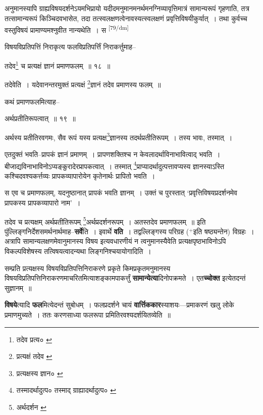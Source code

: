 \documentclass[article,12pt,a4paper]{memoir}
\newcommand{\add}[1]{($^{+}$#1)}
\begin{document}
	  \pstart अनुमानस्यापि ग्राह्यविषयदर्शनेऽयमभिप्रायो यदीदमनुमानमनर्थमनग्निव्यावृत्तिमात्रं सामान्यरूपं गृहणाति, तत्र तत्सामान्यरूपं किञ्चिदवभासेत, तदा तत्स्वलक्षणत्वेनावस्यत्स्वलक्षणं प्रवृत्तिविषयीकुर्यात् । तथा कुर्वच्च वस्तुविषयं प्रामाण्यमश्नुवीत नान्यथेति । स \leavevmode\textsuperscript{\rmlatinfont\tiny [79/dm]} 
	  
	विषयविप्रतिपत्तिं निराकृत्य फलविप्रतिपर्त्तिं निराकर्त्तुमाह-- 
	  
	तदेव\footnote{तदेव प्रत्य० \cite{dp-msC}} च प्रत्यक्षं ज्ञानं प्रमाणफलम् ॥ १८ ॥ 
	  
	तदेवेति । यदेवानन्तरमुक्तं प्रत्यक्षं \footnote{प्रत्यक्षं तदेव \cite{dp-msA} \cite{dp-msB} \cite{dp-edP} \cite{dp-edH} \cite{dp-edE}}ज्ञानं तदेव प्रमाणस्य फलम् ॥ 
	  
	कथं प्रमाणफलमित्याह-- 
	  
	अर्थप्रतीतिरूपत्वात् ॥ १९ ॥ 
	  
	अर्थस्य प्रतीतिरवगमः, सैव रूपं यस्य प्रत्यक्ष\footnote{प्रत्यक्षस्य ज्ञान० \cite{dp-msD}}ज्ञानस्य तदर्थप्रतीतिरूपम् । तस्य भावः, तस्मात् । 
	  
	एतदुक्तं भवति--प्रापकं ज्ञानं प्रमाणम् । प्रापणशक्तिश्च न केवलादर्थाविनाभावित्वाद् भवति । बीजाद्यविनाभाविनोऽप्यङ्कुरादेरप्रापकत्वात् । तस्मात् \footnote{तस्मादर्थादुत्प० \cite{dp-msA} \cite{dp-edP} \cite{dp-edH} \cite{dp-edE} तस्माद् ग्राह्यादर्थादुत्प० \cite{dp-edN}}प्राप्यादर्थादुत्पत्तावप्यस्य ज्ञानस्याऽस्ति कश्चिदवश्यकर्त्तव्यः प्रापकव्यापारोयेन कृतेनार्थः प्रापितो भवति । 
	  
	स एव च प्रमाणफलम्, यदनुष्ठानात् प्रापकं भवति ज्ञानम् । उक्तं च पुरस्तात् ‘प्रवृत्तिविषयप्रदर्शनमेव प्रापकस्य प्रापकव्यापारो नाम’ । 
	  
	तदेव च प्रत्यक्षम् अर्थप्रतीतिरूपम् \footnote{अर्थदर्शन \cite{dp-msA} \cite{dp-edP} \cite{dp-edH} \cite{dp-edE} \cite{dp-edN}}अर्थप्रदर्शनरूपम् । अतस्तदेव प्रमाणफलम् ॥ इति पुंल्लिङ्गनिर्देशसमर्थनार्थमाह--\textbf{सर्वे}ति । इवार्थे \textbf{वति} । तद्वल्लिङ्गस्य परिग्रह \add{इति षष्ठ्यन्तेन} विग्रहः । अत्रापि सामान्यलक्षणमेवानुमानस्य विषय इत्यवधारणीयं न त्वनुमानस्यैवेति प्रत्यक्षपृष्ठभाविनोऽपि विकल्पविशेषस्य तत्विषयत्वादन्यथा लिङ्गनिश्चयायोगादिति ।
	\pend
      

	  \pstart सम्प्रति प्रत्यक्षस्य विषयविप्रतिपत्तिनिराकरणे प्रकृते किमप्रकृतमनुमानस्य विषयविप्रतिपत्तिनिराकरणमाचरितमित्याशङ्कामपाकर्त्तुं \textbf{सामान्येत्या}दिनोपक्रमते । एत\textbf{च्चोक्त} इत्येतदन्तं सुज्ञानम् ॥
	\pend
      

	  \pstart \textbf{विषये}त्यादि \textbf{फल}मित्येदन्तं सुबोधम् । फलप्रदर्शने चायं \textbf{वार्त्तिककार}स्याशयः—प्रमाकरणं खलु लोके प्रमाणमुच्यते । ततः करणसाध्या फलरूपा प्रमितिरवश्यदर्शयितव्येति ॥
	\pend
      
\end{document}
